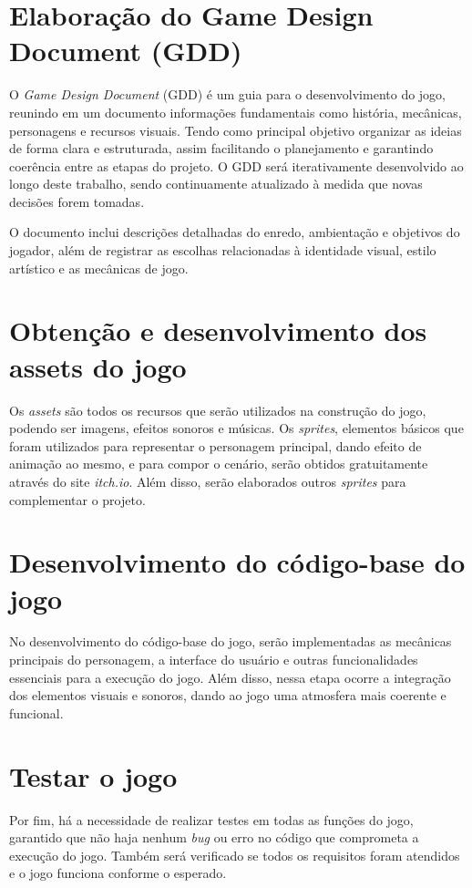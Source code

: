 \section{Elaboração do Game Design Document (GDD)}

O \textit{Game Design Document} (GDD) é um guia para o desenvolvimento do jogo, reunindo em um documento informações fundamentais como história, mecânicas, personagens e recursos visuais. Tendo como principal objetivo organizar as ideias de forma clara e estruturada, assim facilitando o planejamento e garantindo coerência entre as etapas do projeto. O GDD será iterativamente desenvolvido ao longo deste trabalho, sendo continuamente atualizado à medida que novas decisões forem tomadas.	

O documento inclui descrições detalhadas do enredo, ambientação e objetivos do jogador, além de registrar as escolhas relacionadas à identidade visual, estilo artístico e as mecânicas de jogo. 


\section{Obtenção e desenvolvimento dos assets do jogo}

Os \textit{assets} são todos os recursos que serão 	utilizados na construção do jogo, podendo ser imagens, efeitos sonoros e músicas. Os \textit{sprites}, elementos básicos que foram utilizados para representar o personagem principal, dando efeito de animação ao mesmo, e para compor o cenário, serão obtidos gratuitamente através do site \textit{itch.io}. Além disso, serão elaborados outros \textit{sprites} para complementar o projeto.

\section{Desenvolvimento do código-base do jogo}

No desenvolvimento do código-base do jogo, serão implementadas as mecânicas principais do personagem, a interface do usuário e outras funcionalidades essenciais para a execução do jogo. Além disso, nessa etapa ocorre a integração dos elementos visuais e sonoros, dando ao jogo uma atmosfera mais coerente e funcional.

\section{Testar o jogo}

Por fim, há a necessidade de realizar testes em todas as funções do jogo, garantido que não haja nenhum \textit{bug} ou erro no código que comprometa a execução do jogo. Também será verificado se todos os requisitos foram atendidos e o jogo funciona conforme o esperado.